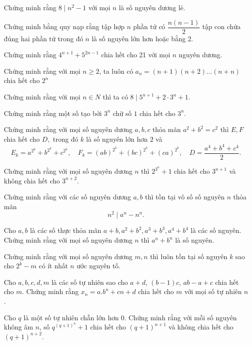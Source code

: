 \begin{bai}
	Chứng minh rằng $8 \mid n^2-1$ với mọi $n$ là số nguyên dương lẻ.
\end{bai}
\begin{bai}
	Chứng minh bằng quy nạp rằng tập hợp $n$ phần tử có $\dfrac{n(n-1)}{2}$ tập con chứa đúng hai phần tử trong đó $n$ là số nguyên lớn hơn hoặc bằng 2.
\end{bai}
\begin{bai}
	Chứng minh rằng $4^{n+1}+5^{2n-1}$ chia hết cho 21 với mọi $n$ nguyên dương.
\end{bai}
\begin{bai}%
	Chứng minh rằng với mọi $ n\ge 2$, ta luôn có $a_n=\left(n+1\right)\left(n+2\right)...\left(n+n\right)$ chia hết cho $2^n$
\end{bai}
\begin{bai}
Chứng minh rằng với mọi $n\in N$ thì ta có $8\mid 5^{n+1}+2\cdot3^n+1.$
\end{bai}

\begin{bai}
Chứng minh rằng một số tạo bởi $3^n$ chữ số $1$ chia hết cho $3^n.$
\end{bai}
\begin{bai}
Chứng minh rằng với mọi số nguyên dương $a,b,c$ thỏa mãn $a^2+b^2=c^2$ thì $E,F$ chia hết cho $D,$ trong đó $k$ là số nguyên lớn hơn $2$ và
$$E_k=a^{2^k}+b^{2^k}+c^{2^k},\quad F_k=(ab)^{2^k}+(bc)^{2^k}+(ca)^{2^k},\quad D=\dfrac{a^4+b^4+c^4}{2}.$$
\end{bai}
\begin{bai}
Chứng minh rằng với mọi số nguyên dương $n$ thì $2^{3^n}+1$ chia hết cho $3^{n+1}$ và không chia hết cho $3^{n+2}.$
\end{bai}
\begin{bai}
 Chứng minh rằng với các số nguyên dương $a,b$ thì tồn tại vô số số nguyên $n$ thỏa mãn
$$n^2\mid a^n-n^n.$$
\end{bai}
\begin{bai}
 Cho $a,b$ là các số thực thỏa mãn $a+b,a^2+b^2,a^3+b^3,a^4+b^4$ là các số nguyên. Chứng minh rằng với mọi số nguyên dương $n$ thì $a^n+b^n$ là số nguyên.
\end{bai}
\begin{bai}
Chứng minh rằng với mọi số nguyên dương $m,n$ thì luôn tồn tại số nguyên $k$ sao cho $2^k-m$ có ít nhất $n$ ước nguyên tố.
\end{bai}
\begin{bai}
	Cho $ a,b,c,d,m$ là các số tự nhiên sao cho $ a+d$, $ (b-1)c$, $ ab-a+c$ chia hết cho $ m$. Chứng minh rằng $x_n=a.b^n+cn+d$ chia hết cho $ m$ với mọi số tự nhiên $ n$.
\end{bai}
\begin{bai}
	Cho $q$ là một số tự nhiên chẵn lớn hơn 0. Chứng minh rằng với mỗi số nguyên không âm $n$, số $q^{(q+1)^{n}}+1$ chia hết cho $(q+1)^{n+1}$ và không
	chia hết cho $(q+1)^{n+2}$.
\end{bai}